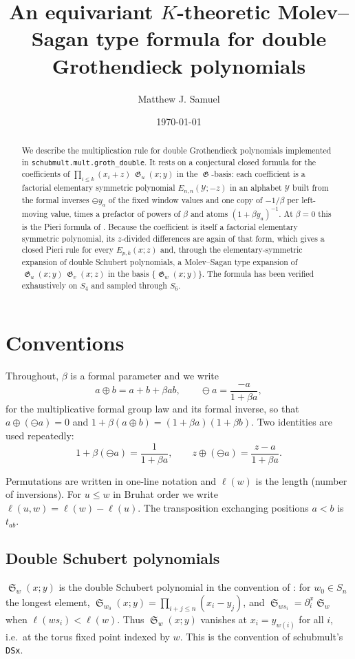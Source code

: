 \documentclass{amsart}
\title[An equivariant $K$-theoretic Molev--Sagan formula]{An equivariant $K$-theoretic Molev--Sagan type formula for double Grothendieck polynomials}
\author{Matthew J. Samuel}
\date{\today}
\theoremstyle{definition}
\theoremstyle{remark}
\DeclareMathOperator{\sch}{\mathfrak{S}}
\DeclareMathOperator{\groth}{\mathfrak{G}}
\newcommand{\fgl}{\oplus}
\newcommand{\fgn}{\ominus}
\newcommand{\schubmult}{\textsf{schubmult}}
\newcommand{\pyid}[1]{\texttt{#1}}
\begin{document}
\begin{abstract}
We describe the multiplication rule for double Grothendieck polynomials implemented in
\pyid{schubmult.mult.groth\_double}. It rests on a conjectural closed formula for the
coefficients of $\prod_{i\le k}(x_i+z)\,\groth_u(x;y)$ in the $\groth$-basis: each coefficient
is a factorial elementary symmetric polynomial $E_{n,n}(\mathcal{Y};-z)$ in an alphabet
$\mathcal{Y}$ built from the formal inverses $\fgn y_a$ of the fixed window values and one copy
of $-1/\beta$ per left-moving value, times a prefactor of powers of $\beta$ and atoms
$(1+\beta y_a)^{-1}$. At $\beta=0$ this is the Pieri formula of
\cite[Theorem~7.1]{samuelmolev}. Because the coefficient is itself a factorial elementary
symmetric polynomial, its $z$-divided differences are again of that form, which gives a
closed Pieri rule for every $E_{p,k}(x;z)$ and, through the elementary-symmetric expansion of
double Schubert polynomials, a Molev--Sagan type expansion of $\groth_u(x;y)\,\groth_v(x;z)$
in the basis $\{\groth_w(x;y)\}$. The formula has been verified exhaustively on $S_4$ and
sampled through $S_6$.
\end{abstract}

\maketitle

\section{Conventions}

Throughout, $\beta$ is a formal parameter and we write
\[
a \fgl b = a + b + \beta ab, \qquad \fgn a = \frac{-a}{1+\beta a},
\]
for the multiplicative formal group law and its formal inverse, so that
$a \fgl (\fgn a) = 0$ and $1+\beta(a\fgl b) = (1+\beta a)(1+\beta b)$. Two identities are used
repeatedly:
\begin{equation}\label{eq:fgl-ids}
    1 + \beta(\fgn a) = \frac{1}{1+\beta a},
    \qquad
    z \fgl (\fgn a) = \frac{z - a}{1+\beta a}.
\end{equation}

Permutations are written in one-line notation and $\ell(w)$ is the length (number of
inversions). For $u\le w$ in Bruhat order we write $\ell(u,w) = \ell(w)-\ell(u)$. The
transposition exchanging positions $a<b$ is $t_{ab}$.

\subsection*{Double Schubert polynomials}
$\sch_w(x;y)$ is the double Schubert polynomial in the convention of \cite{samuelmolev}: for
$w_0\in S_n$ the longest element,
$\sch_{w_0}(x;y) = \prod_{i+j\le n}(x_i - y_j)$, and $\sch_{ws_i} = \partial_i^x \sch_w$ when
$\ell(ws_i)<\ell(w)$. Thus $\sch_w(x;y)$ vanishes at $x_i = y_{w(i)}$ for all $i$, i.e.\ at the
torus fixed point indexed by $w$. This is the convention of \schubmult's \pyid{DSx}.
\end{document}
